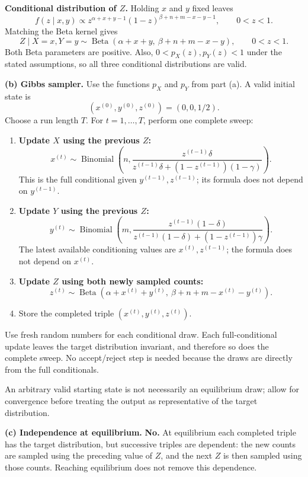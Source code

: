 \documentclass[11pt,a4paper]{article}
\newcommand{\given}{\mathrel{|}}
\begin{document}
\textbf{Conditional distribution of $Z$.}
Holding $x$ and $y$ fixed leaves
\[
f(z\given x,y)\propto
z^{\alpha+x+y-1}(1-z)^{\beta+n+m-x-y-1},\qquad0<z<1.
\]
Matching the Beta kernel gives
\[
\boxed{Z\given X=x,Y=y\sim
\operatorname{Beta}(\alpha+x+y,\ \beta+n+m-x-y),\qquad0<z<1.}
\]
Both Beta parameters are positive. Also, $0<p_X(z),p_Y(z)<1$ under
the stated assumptions, so all three conditional distributions are valid.

\textbf{(b) Gibbs sampler.}
Use the functions $p_X$ and $p_Y$ from part (a). A valid initial state is
\[
\boxed{(x^{(0)},y^{(0)},z^{(0)})=(0,0,1/2).}
\]
Choose a run length $T$. For $t=1,\ldots,T$, perform one complete sweep:
\begin{enumerate}[label=\arabic*.]
  \item \textbf{Update $X$ using the previous $Z$:}
        \[
        x^{(t)}\sim\operatorname{Binomial}\!\left(
        n,\frac{z^{(t-1)}\delta}
        {z^{(t-1)}\delta+(1-z^{(t-1)})(1-\gamma)}\right).
        \]
        This is the full conditional given $y^{(t-1)},z^{(t-1)}$;
        its formula does not depend on $y^{(t-1)}$.
  \item \textbf{Update $Y$ using the previous $Z$:}
        \[
        y^{(t)}\sim\operatorname{Binomial}\!\left(
        m,\frac{z^{(t-1)}(1-\delta)}
        {z^{(t-1)}(1-\delta)+(1-z^{(t-1)})\gamma}\right).
        \]
        The latest available conditioning values are $x^{(t)},z^{(t-1)}$;
        the formula does not depend on $x^{(t)}$.
  \item \textbf{Update $Z$ using both newly sampled counts:}
        \[
        z^{(t)}\sim\operatorname{Beta}\!\left(
        \alpha+x^{(t)}+y^{(t)},\
        \beta+n+m-x^{(t)}-y^{(t)}\right).
        \]
  \item Store the completed triple $(x^{(t)},y^{(t)},z^{(t)})$.
\end{enumerate}
Use fresh random numbers for each conditional draw. Each full-conditional
update leaves the target distribution invariant, and therefore so does
the complete sweep. No accept/reject step is needed because the draws are
directly from the full conditionals.

An arbitrary valid starting state is not necessarily an equilibrium draw;
allow for convergence before treating the output as representative of the
target distribution.

\textbf{(c) Independence at equilibrium.}
\textbf{No.} At equilibrium each completed triple has the target
distribution, but successive triples are dependent: the new counts are
sampled using the preceding value of $Z$, and the next $Z$ is then sampled
using those counts. Reaching equilibrium does not remove this dependence.
\end{document}

